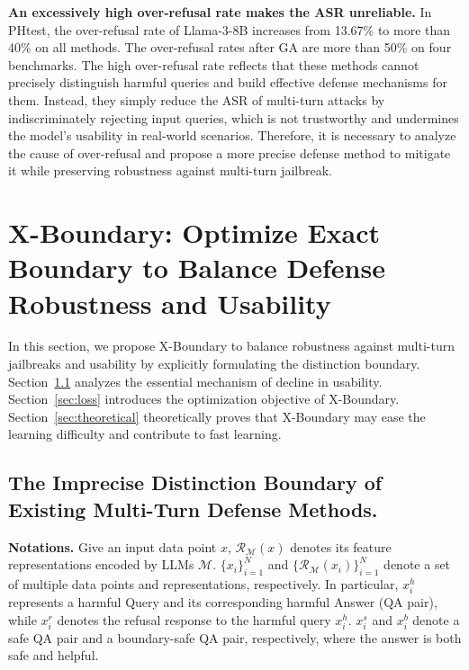 \textbf{An excessively high over-refusal rate makes the ASR unreliable.}
%
In PHtest, the over-refusal rate of Llama-3-8B increases from 13.67\% to more than 40\% on all methods.
%
The over-refusal rates after GA are more than 50\% on four benchmarks.
%
The high over-refusal rate reflects that these methods cannot precisely distinguish harmful queries and build effective defense mechanisms for them. 
%
Instead, they simply reduce the ASR of multi-turn attacks by indiscriminately rejecting input queries, which is not trustworthy and undermines the model’s usability in real-world scenarios.
%
Therefore, it is necessary to analyze the cause of over-refusal and propose a more precise defense method to mitigate it while preserving robustness against multi-turn jailbreak.

\section{X-Boundary: Optimize Exact Boundary to Balance Defense Robustness and Usability}
In this section, we propose X-Boundary to balance robustness against multi-turn jailbreaks and usability by explicitly formulating the distinction boundary.
%
Section~\ref{sec:formulation} analyzes the essential mechanism of decline in usability. Section~\ref{sec:loss} introduces the optimization objective of X-Boundary. Section~\ref{sec:theoretical} theoretically proves that X-Boundary may ease the learning difficulty and contribute to fast learning.

\subsection{The Imprecise Distinction Boundary of Existing Multi-Turn Defense Methods.}
\label{sec:formulation}
%
\textbf{Notations.} Give an input data point $x$, $\mathcal{R}_{\mathcal{M}} \left(x \right)$ denotes its feature representations encoded by LLMs $\mathcal{M}$.
%
$\{x_i\}_{i=1}^N$ and $\{\mathcal{R}_{\mathcal{M}} \left(x_i \right)\}_{i=1}^N$ denote a set of multiple data points and representations, respectively.
%
In particular, $x_i^h$ represents a harmful Query and its corresponding harmful Answer (QA pair), while $x_i^r$ denotes the refusal response to the harmful query $x_i^h$.
%
$x_i^s$ and $x_i^b$ denote a safe QA pair and a boundary-safe QA pair, respectively, where the answer is both safe and helpful.

